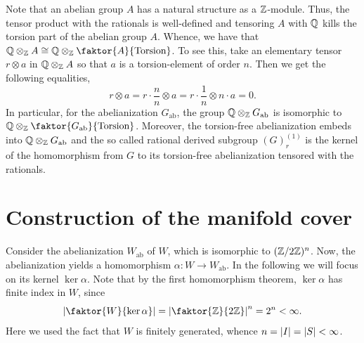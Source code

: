 \begin{remark}\label{rmk:tensoring}
    Note that an abelian group \(A\) has a natural structure as a \(\mathbb{Z}\)-module.
    Thus, the tensor product with the rationals is well-defined and tensoring \(A\) with \(\mathbb{Q}\) kills the torsion part of the abelian group \(A\).
    Whence, we have that \(\Q \otimes_\Z A \cong \Q \otimes_\Z \faktor{A}{\text{Torsion}}\).
    To see this, take an elementary tensor \(r \otimes a\) in \(\mathbb{Q} \otimes_{\mathbb{Z}} A\) so that \(a\) is a torsion-element of order \(n\).
    Then we get the following equalities,
    \[r \otimes a  = r \cdot \frac{n}{n} \otimes a = r \cdot \frac{1}{n} \otimes n\cdot a = 0.\]
    In particular, for the abelianization \(G_{\text{ab}}\), the group \(\mathbb{Q} \otimes_{\mathbb{Z}} G_{\text{ab}}\) is isomorphic to \(\Q \otimes_\Z \faktor{G_{\text{ab}}}{\text{Torsion}}\).
    Moreover, the torsion-free abelianization embeds into \(\mathbb{Q} \otimes_{\mathbb{Z}} G_{\text{ab}}\) and the so called rational derived subgroup \((G)_r^{(1)}\) is the kernel of the homomorphism from \(G\) to its torsion-free abelianization tensored with the rationals.
\end{remark}


\section{Construction of the manifold cover}

Consider the abelianization \(W_{\text{ab}}\) of \(W\), which is isomorphic to \((\mathbb{Z}/2\mathbb{Z})^{n}\).
Now, the abelianization yields a homomorphism \(\alpha : W \to W_{\text{ab}}\).
In the following we will focus on its kernel \(\ker\alpha\). %
Note that by the first homomorphism theorem, \(\ker\alpha\) has finite index in \(W\), since
\[\abs{\faktor{W}{\ker\alpha}} = \abs{\faktor{\Z}{2\Z}}^{n} = 2^{n} < \infty.\]
Here we used the fact that \(W\) is finitely generated, whence \(n = \left\vert I\right\vert = \left\vert S\right\vert < \infty\).

